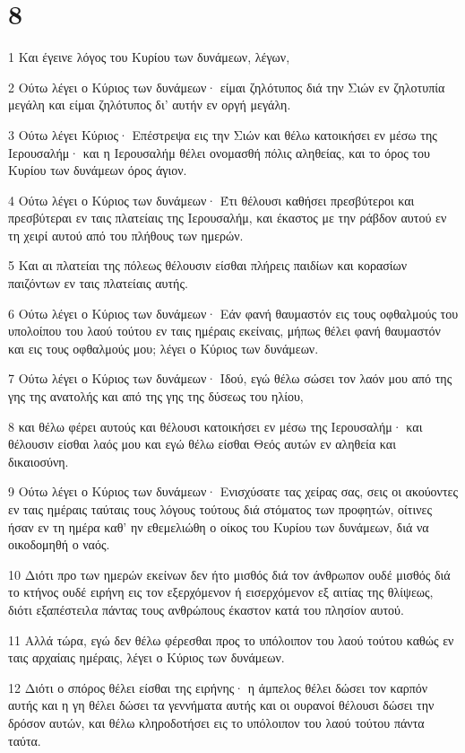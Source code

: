 \chapter{8}

\par 1 Και έγεινε λόγος του Κυρίου των δυνάμεων, λέγων,
\par 2 Ούτω λέγει ο Κύριος των δυνάμεων· είμαι ζηλότυπος διά την Σιών εν ζηλοτυπία μεγάλη και είμαι ζηλότυπος δι' αυτήν εν οργή μεγάλη.
\par 3 Ούτω λέγει Κύριος· Επέστρεψα εις την Σιών και θέλω κατοικήσει εν μέσω της Ιερουσαλήμ· και η Ιερουσαλήμ θέλει ονομασθή πόλις αληθείας, και το όρος του Κυρίου των δυνάμεων όρος άγιον.
\par 4 Ούτω λέγει ο Κύριος των δυνάμεων· Έτι θέλουσι καθήσει πρεσβύτεροι και πρεσβύτεραι εν ταις πλατείαις της Ιερουσαλήμ, και έκαστος με την ράβδον αυτού εν τη χειρί αυτού από του πλήθους των ημερών.
\par 5 Και αι πλατείαι της πόλεως θέλουσιν είσθαι πλήρεις παιδίων και κορασίων παιζόντων εν ταις πλατείαις αυτής.
\par 6 Ούτω λέγει ο Κύριος των δυνάμεων· Εάν φανή θαυμαστόν εις τους οφθαλμούς του υπολοίπου του λαού τούτου εν ταις ημέραις εκείναις, μήπως θέλει φανή θαυμαστόν και εις τους οφθαλμούς μου; λέγει ο Κύριος των δυνάμεων.
\par 7 Ούτω λέγει ο Κύριος των δυνάμεων· Ιδού, εγώ θέλω σώσει τον λαόν μου από της γης της ανατολής και από της γης της δύσεως του ηλίου,
\par 8 και θέλω φέρει αυτούς και θέλουσι κατοικήσει εν μέσω της Ιερουσαλήμ· και θέλουσιν είσθαι λαός μου και εγώ θέλω είσθαι Θεός αυτών εν αληθεία και δικαιοσύνη.
\par 9 Ούτω λέγει ο Κύριος των δυνάμεων· Ενισχύσατε τας χείρας σας, σεις οι ακούοντες εν ταις ημέραις ταύταις τους λόγους τούτους διά στόματος των προφητών, οίτινες ήσαν εν τη ημέρα καθ' ην εθεμελιώθη ο οίκος του Κυρίου των δυνάμεων, διά να οικοδομηθή ο ναός.
\par 10 Διότι προ των ημερών εκείνων δεν ήτο μισθός διά τον άνθρωπον ουδέ μισθός διά το κτήνος ουδέ ειρήνη εις τον εξερχόμενον ή εισερχόμενον εξ αιτίας της θλίψεως, διότι εξαπέστειλα πάντας τους ανθρώπους έκαστον κατά του πλησίον αυτού.
\par 11 Αλλά τώρα, εγώ δεν θέλω φέρεσθαι προς το υπόλοιπον του λαού τούτου καθώς εν ταις αρχαίαις ημέραις, λέγει ο Κύριος των δυνάμεων.
\par 12 Διότι ο σπόρος θέλει είσθαι της ειρήνης· η άμπελος θέλει δώσει τον καρπόν αυτής και η γη θέλει δώσει τα γεννήματα αυτής και οι ουρανοί θέλουσι δώσει την δρόσον αυτών, και θέλω κληροδοτήσει εις το υπόλοιπον του λαού τούτου πάντα ταύτα.
